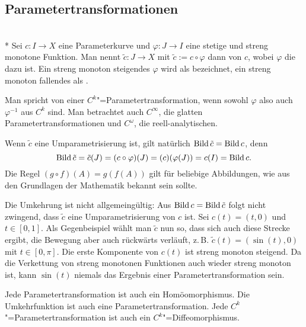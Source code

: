 \pagebreak
\subsection{Parametertransformationen}

\begin{definition}\mbox{}\\*
Sei $c\colon I\to X$ eine Parameterkurve und $\varphi\colon J\to I$
eine stetige und streng monotone Funktion. Man nennt
$\tilde c\colon J\to X$ mit $\tilde c:=c\circ\varphi$ dann
 von $c$, wobei $\varphi$ die
 dazu ist. Ein streng monoton steigendes
$\varphi$ wird als  bezeichnet,
ein streng monoton fallendes als .

Man spricht von einer $C^k$"=Parametertransformation, wenn sowohl
$\varphi$ also auch $\varphi^{-1}$ aus $C^k$ sind. Man betrachtet
auch $C^\infty$, die glatten Parametertransformationen und
$C^\omega$, die reell-analytischen.
\end{definition}

\noindent
Wenn $\tilde c$ eine Umparametrisierung ist, gilt natürlich
$\operatorname{Bild}\tilde c=\operatorname{Bild} c$, denn
\begin{equation}
\operatorname{Bild}\tilde c = \tilde c(J)
= (c\circ\varphi)(J) = (c)(\varphi(J))
= c(I) = \operatorname{Bild} c.
\end{equation}
Die Regel $(g\circ f)(A)=g(f(A))$ gilt für beliebige Abbildungen,
wie aus den Grundlagen der Mathematik bekannt sein sollte.

Die Umkehrung ist nicht allgemeingültig: Aus
$\operatorname{Bild} c=\operatorname{Bild}\tilde c$ folgt nicht zwingend, dass
$\tilde c$ eine Umparametrisierung von $c$ ist. Sei
$c(t)=(t,0)$ und $t\in[0,1]$. Als Gegenbeispiel wählt man
$\tilde c$ nun so, dass sich auch diese Strecke ergibt, die
Bewegung aber auch rückwärts verläuft, z.\,B. $\tilde c(t)=(\sin(t),0)$
mit $t\in[0,\pi]$. Die erste Komponente von $c(t)$ ist streng
monoton steigend. Da die Verkettung von streng monotonen Funktionen
auch wieder streng monoton ist, kann $\sin(t)$ niemals das Ergebnis
einer Parametertransformation sein.

\begin{corollary}
Jede Parametertransformation ist auch ein
Homöomorphismus. Die Umkehrfunktion ist auch eine
Parametertransformation. Jede $C^k$"=Parametertransformation
ist auch ein $C^k$"=Diffeomorphismus.
\end{corollary}

